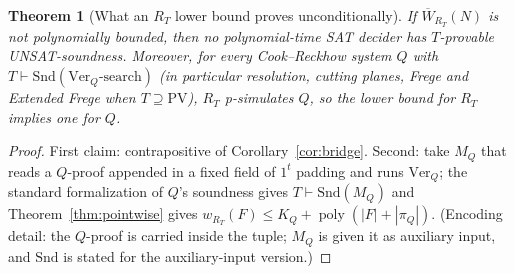 \documentclass[11pt]{article}
\newtheorem{theorem}{Theorem}
\theoremstyle{definition}
\newcommand{\poly}{\operatorname{poly}}
\newcommand{\Wbar}{\overline W}
\begin{document}
\begin{theorem}[What an $R_T$ lower bound proves unconditionally]\label{thm:lb-consequence}
If $\Wbar_{R_T}(N)$ is not polynomially bounded, then no polynomial-time SAT decider
has $T$-provable UNSAT-soundness. Moreover, for every Cook--Reckhow system $Q$ with
$T\vdash\mathrm{Snd}(\mathrm{Ver}_Q\text{-search})$ (in particular resolution,
cutting planes, Frege and Extended Frege when $T\supseteq\mathrm{PV}$), $R_T$
p-simulates $Q$, so the lower bound for $R_T$ implies one for $Q$.
\end{theorem}
\begin{proof}
First claim: contrapositive of Corollary~\ref{cor:bridge}. Second: take $M_Q$ that
reads a $Q$-proof appended in a fixed field of $1^t$ padding and runs $\mathrm{Ver}_Q$;
the standard formalization of $Q$'s soundness gives $T\vdash\mathrm{Snd}(M_Q)$ and
Theorem~\ref{thm:pointwise} gives $w_{R_T}(F)\le K_Q+\poly(|F|+|\pi_Q|)$. (Encoding
detail: the $Q$-proof is carried inside the tuple; $M_Q$ is given it as auxiliary
input, and $\mathrm{Snd}$ is stated for the auxiliary-input version.)
\end{proof}
\end{document}
